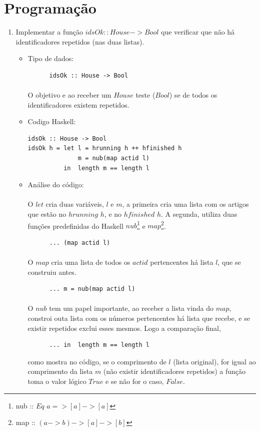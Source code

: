 \documentclass[a4paper]{article}
\begin{document}
\section{Programação}
\begin{enumerate}
\item 
Implementar a função $idsOk :: House -> Bool$ que verificar que não há identificadores repetidos (nas duas listas).
\begin{itemize}
\item {Tipo de dados:}
\begin{verbatim}
      idsOk :: House -> Bool
\end{verbatim}
\paragraph{}O objetivo e ao receber um $House$ teste ($Bool$) se de todos os identificadores existem repetidos.
\item {Codigo Haskell:}
\begin{verbatim}
idsOk :: House -> Bool
idsOk h = let l = hrunning h ++ hfinished h
              m = nub(map actid l)
          in  length m == length l
\end{verbatim}
\item {Análise do código:}
\paragraph{}O $let$ cria duas variáveis, $l$ e $m$, a primeira cria uma lista com os artigos que estão no $hrunning$ $h$, e no $hfinished$ $h$. A segunda, utiliza duas funções predefinidas do Haskell $nub$\footnote{nub :: $Eq$ $a => [a] -> [a]$} e $map$\footnote{map :: $(a -> b) -> [a] -> [b]$}.
\begin{verbatim}
      ... (map actid l)
\end{verbatim}
\paragraph{}O $map$ cria uma lista de todos os $actid$ pertencentes há lista $l$, que se construiu antes. 
\begin{verbatim}
      ... m = nub(map actid l)
\end{verbatim}
\paragraph{}O $nub$ tem um papel importante, ao receber a lista vinda do $map$, constroi outa lista com os números pertencentes há lista que recebe, e se existir repetidos exclui esses mesmos. Logo a comparação final, 
\begin{verbatim}
      ... in  length m == length l
\end{verbatim}
como mostra no código, se o comprimento de $l$ (lista original), for igual ao comprimento da lista $m$ (não existir identificadores repetidos) a função toma o valor lógico $True$ e se não for o caso, $False$.
\end{itemize}


\end{enumerate}
\end{document}
